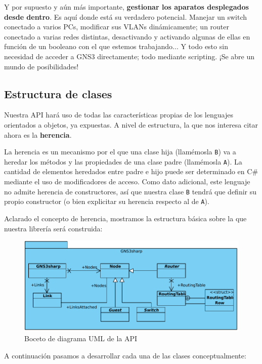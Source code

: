 Y por supuesto y aún más importante, \textbf{gestionar los aparatos desplegados desde dentro}. Es aquí donde está su verdadero potencial. Manejar un switch conectado a varios PCs, modificar sus VLANs dinámicamente; un router conectado a varias redes distintas, desactivando y activando algunas de ellas en función de un booleano con el que estemos trabajando... Y todo esto sin necesidad de acceder a GNS3 directamente; todo mediante scripting. ¡Se abre un mundo de posibilidades!

\subsection{Estructura de clases}
Nuestra API hará uso de todas las características propias de los lenguajes orientados a objetos, ya expuestas. A nivel de estructura, la que nos interesa citar ahora es la \textbf{herencia}.

La herencia es un mecanismo por el que una clase hija (llamémosla \texttt{B}) va a heredar los métodos y las propiedades de una clase padre (llamémosla \texttt{A}). La cantidad de elementos heredados entre padre e hijo puede ser determinado en C\# mediante el uso de modificadores de acceso. Como dato adicional, este lenguaje no admite herencia de constructores, así que nuestra clase \texttt{B} tendrá que definir su propio constructor (o bien explicitar su herencia respecto al de \texttt{A}).

Aclarado el concepto de herencia, mostramos la estructura básica sobre la que nuestra librería será construida:

\begin{figure}[H]
  \centering
  \includegraphics[scale=0.75]{imagenes/diagrama_api1}
  \caption{Boceto de diagrama UML de la API}
  \label{fig:diagrama_api1}
\end{figure}

A continuación pasamos a desarrollar cada una de las clases conceptualmente:

